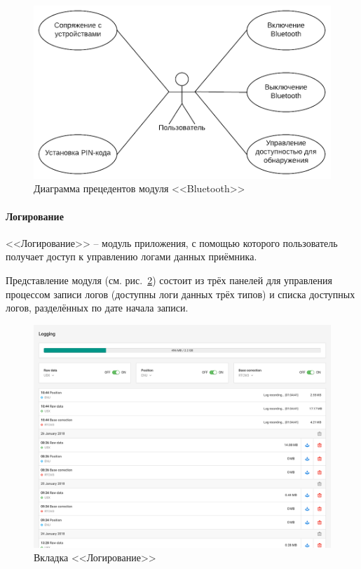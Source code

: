 \begin{figure}[h!]
  \centering
  \setlength{\fboxsep}{5pt}
  \includegraphics[width=.75\textwidth]{img/uml/bt_usecase}
  \vspace*{6pt}
  \caption{Диаграмма прецедентов модуля <<Bluetooth>>}
  \label{fig:bt-uml-usecase}
\end{figure}

\paragraph{Логирование}

<<Логирование>> -- модуль приложения, с помощью которого пользователь получает доступ к управлению логами данных приёмника.

Представление модуля (см. рис.~\ref{fig:logging}) состоит из трёх панелей для управления процессом записи логов (доступны логи данных трёх типов) и списка доступных логов, разделённых по дате начала записи.

\begin{figure}[h!]
  \centering
  \setlength{\fboxsep}{5pt}
  \includegraphics[width=.8\textwidth]{img/reachview/logging_content_laptop}
  \vspace*{6pt}
  \caption{Вкладка <<Логирование>>}
  \label{fig:logging}
\end{figure}

